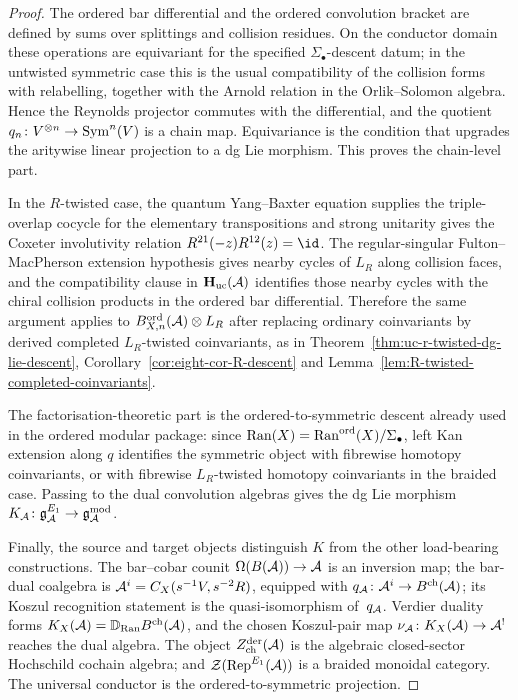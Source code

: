 \begin{proof}
The ordered bar differential and the ordered convolution bracket are
defined by sums over splittings and collision residues. On the
conductor domain these operations are equivariant for the specified
$\Sigma_\bullet$-descent datum; in the untwisted symmetric case this is
the usual compatibility of the collision forms with relabelling,
together with the Arnold relation in the Orlik--Solomon algebra. Hence
the Reynolds projector commutes with the differential, and the quotient
$q_n\colon V^{\otimes n}\to \operatorname{Sym}^n(V)$ is a chain map.  Equivariance
is the condition that upgrades the aritywise linear projection to a dg
Lie morphism. This proves the chain-level part.

In the $R$-twisted case, the quantum Yang--Baxter equation supplies the
triple-overlap cocycle for the elementary transpositions and strong
unitarity gives the Coxeter involutivity relation
$R^{21}(-z)R^{12}(z)=\id$. The regular-singular
Fulton--MacPherson extension hypothesis gives nearby cycles of
$L_R$ along collision faces, and the compatibility clause in
$\mathbf H_{\mathrm{uc}}(\mathcal{A})$ identifies those nearby cycles with the
chiral collision products in the ordered bar differential. Therefore
the same argument applies to
$B^{\mathrm{ord}}_{X,n}(\mathcal{A})\otimes L_R$ after replacing ordinary
coinvariants by derived completed $L_R$-twisted coinvariants, as in
Theorem~\ref{thm:uc-r-twisted-dg-lie-descent},
Corollary~\ref{cor:eight-cor-R-descent} and
Lemma~\ref{lem:R-twisted-completed-coinvariants}.

The factorisation-theoretic part is the ordered-to-symmetric descent
already used in the ordered modular package: since
$\operatorname{Ran}(X)=\operatorname{Ran}^{\mathrm{ord}}(X)/\Sigma_\bullet$, left Kan extension along $q$
identifies the symmetric object with fibrewise homotopy coinvariants,
or with fibrewise $L_R$-twisted homotopy coinvariants in the braided
case.
Passing to the dual convolution algebras gives the dg Lie morphism
$K_{\mathcal{A}}\colon \mathfrak{g}_{\mathcal{A}}^{E_1}\to \mathfrak{g}_{\mathcal{A}}^{\mathrm{mod}}$.

Finally, the source and target objects distinguish $K$ from the other
load-bearing constructions. The bar--cobar counit
$\Omega(B(\mathcal{A}))\to \mathcal{A}$ is an inversion map; the bar-dual coalgebra is
$\mathcal{A}^i=C_X(s^{-1}V,s^{-2}R)$, equipped with
$q_{\mathcal{A}}\colon\mathcal{A}^i\to B^{\mathrm{ch}}(\mathcal{A})$; its Koszul recognition
statement is the quasi-isomorphism of~$q_{\mathcal{A}}$.  Verdier duality forms
$K_X(\mathcal{A})=\mathbb D_{\operatorname{Ran}}B^{\mathrm{ch}}(\mathcal{A})$, and the chosen
Koszul-pair map $\nu_{\mathcal{A}}\colon K_X(\mathcal{A})\to\mathcal{A}^!$ reaches the dual
algebra.  The object $Z^{\mathrm{der}}_{\mathrm{ch}}(\mathcal{A})$ is the algebraic
closed-sector Hochschild cochain algebra; and
$\mathcal Z(\operatorname{Rep}^{E_1}(\mathcal{A}))$ is a braided monoidal category. The
universal conductor is the ordered-to-symmetric projection.
\end{proof}

